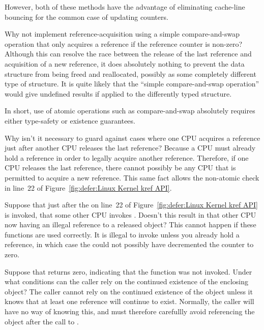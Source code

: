 \begin{enumerate}
	However, both of these methods have the advantage of eliminating
	cache-line bouncing for the common case of updating counters.

\QuickQ{}
	Why not implement reference-acquisition using
	a simple compare-and-swap operation that only
	acquires a reference if the reference counter is
	non-zero?
\QuickA{}
	Although this can resolve the race between the release of
	the last reference and acquisition of a new reference,
	it does absolutely nothing to prevent the data structure
	from being freed and reallocated, possibly as some completely
	different type of structure.
	It is quite likely that the ``simple compare-and-swap
	operation'' would give undefined results if applied to the
	differently typed structure.

	In short, use of atomic operations such as compare-and-swap
	absolutely requires either type-safety or existence guarantees.

\QuickQ{}
	Why isn't it necessary to guard against cases where one CPU
	acquires a reference just after another CPU releases the last
	reference?
\QuickA{}
	Because a CPU must already hold a reference in order
	to legally acquire another reference.
	Therefore, if one CPU releases the last reference,
	there cannot possibly be any CPU that is permitted
	to acquire a new reference.
	This same fact allows the non-atomic check in line~22
	of Figure~\ref{fig:defer:Linux Kernel kref API}.

\QuickQ{}
	Suppose that just after the 
	on line~22 of
	Figure~\ref{fig:defer:Linux Kernel kref API} is invoked,
	that some other CPU invokes .
	Doesn't this result in that other CPU now having an illegal
	reference to a released object?
\QuickA{}
	This cannot happen if these functions are used correctly.
	It is illegal to invoke  unless you already
	hold a reference, in which case the  could
	not possibly have decremented the counter to zero.

\QuickQ{}
	Suppose that  returns zero, indicating that
	the  function was not invoked.
	Under what conditions can the caller rely on the continued
	existence of the enclosing object?
\QuickA{}
	The caller cannot rely on the continued existence of the
	object unless it knows that at least one reference will
	continue to exist.
	Normally, the caller will have no way of knowing this, and
	must therefore carefullly avoid referencing the object after
	the call to .


\end{enumerate}
